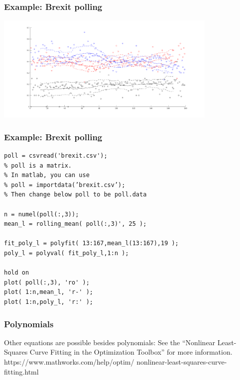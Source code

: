 \documentclass[11pt]{beamer}
\begin{document}


\begin{frame}[fragile]
  \frametitle{Example:  Brexit polling}

  \includegraphics[width=0.8\textwidth]{./img/brexit.png}
\end{frame}

\begin{frame}[fragile]
  \frametitle{Example:  Brexit polling}

  \begin{Verbatim}
poll = csvread('brexit.csv');
% poll is a matrix. 
% In matlab, you can use 
% poll = importdata(’brexit.csv’);
% Then change below poll to be poll.data

n = numel(poll(:,3));
mean_l = rolling_mean( poll(:,3)', 25 );

fit_poly_l = polyfit( 13:167,mean_l(13:167),19 );  
poly_l = polyval( fit_poly_l,1:n );

hold on
plot( poll(:,3), 'ro' );
plot( 1:n,mean_l, 'r-' );
plot( 1:n,poly_l, 'r:' );
  \end{Verbatim}
\end{frame}

\begin{frame}[fragile]
  \frametitle{Polynomials}

  \begin{enumerate}
  \myitem  Other equations are possible besides polynomials:
  \mysubitem  See the ``Nonlinear Least-Squares Curve Fitting in the Optimization Toolbox'' for more information.
  https://www.mathworks.com/help/optim/
  nonlinear-least-squares-curve-fitting.html
  \end{enumerate}
\end{frame}
\end{document}
